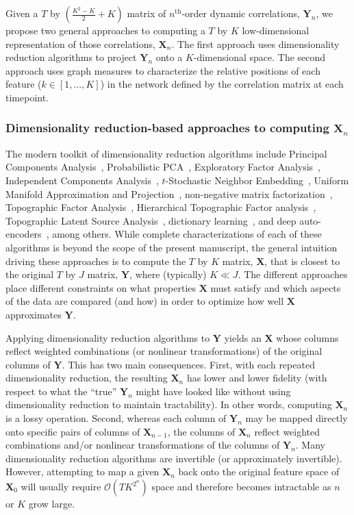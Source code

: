 \documentclass[english]{article}
\begin{document}
Given a $T$ by $\left( \frac{K^2 - K}{2} + K \right)$ matrix of
$n^\mathrm{th}$-order dynamic correlations, $\mathbf{Y}_n$, we propose
two general approaches to computing a $T$ by $K$ low-dimensional
representation of those correlations, $\mathbf{X}_n$.  The first
approach uses dimensionality reduction algorithms to project
$\mathbf{Y}_n$ onto a $K$-dimensional space.  The second approach uses
graph measures to characterize the relative positions of each feature
($k \in \left[1, ..., K \right]$) in the network defined by the
correlation matrix at each timepoint.

\subsubsection*{Dimensionality reduction-based approaches to computing
  $\mathbf{X}_n$}

The modern toolkit of dimensionality reduction algorithms include
Principal Components Analysis~\citep[PCA;][]{Pear01}, Probabilistic
PCA~\citep[PPCA;][]{TippBish99}, Exploratory Factor
Analysis~\citep[EFA;][]{Spea04}, Independent Components
Analysis~\citep[ICA;][]{JuttHera91, ComoEtal91}, $t$-Stochastic
Neighbor Embedding~\citep[$t$-SNE;][]{vandHint08}, Uniform Manifold
Approximation and Projection~\citep[UMAP;][]{McInEtal18}, non-negative
matrix factorization~\citep[NMF;][]{LeeSeun99}, Topographic Factor
Analysis~\cite[TFA;][]{MannEtal14b}, Hierarchical Topographic Factor
analysis~\cite[HTFA;][]{MannEtal18}, Topographic Latent Source
Analysis~\cite[TLSA;][]{GersEtal11}, dictionary
learning~\citep{MairEtal09a, MairEtal09b}, and deep
auto-encoders~\citep{HintSala06}, among others.  While complete
characterizations of each of these algorithms is beyond the scope of
the present manuscript, the general intuition driving these approaches
is to compute the $T$ by $K$ matrix, $\mathbf{X}$, that is closest to
the original $T$ by $J$ matrix, $\mathbf{Y}$, where (typically)
$K \ll J$.  The different approaches place different constraints on
what properties $\mathbf{X}$ must satisfy and which aspects of the
data are compared (and how) in order to optimize how well
$\mathbf{X}$ approximates $\mathbf{Y}$.

Applying dimensionality reduction algorithms to $\mathbf{Y}$ yields an
$\mathbf{X}$ whose columns reflect weighted combinations (or nonlinear
transformations) of the original columns of $\mathbf{Y}$.  This has
two main consequences.  First, with each repeated dimensionality
reduction, the resulting $\mathbf{X}_n$ has lower and lower fidelity
(with respect to what the ``true'' $\mathbf{Y}_n$ might have looked
like without using dimensionality reduction to maintain tractability).
In other words, computing $\mathbf{X}_n$ is a lossy operation.
Second, whereas each column of $\mathbf{Y}_n$ may be mapped
directly onto specific pairs of columns of $\mathbf{X}_{n-1}$, the
columns of $\mathbf{X}_n$ reflect weighted combinations and/or
nonlinear transformations of the columns of $\mathbf{Y}_n$.  Many
dimensionality reduction algorithms are invertible (or approximately
invertible).  However, attempting to map a given $\mathbf{X}_n$ back
onto the original feature space of $\mathbf{X}_0$ will usually require
$\mathcal{O}(TK^{2^n})$ space and therefore becomes intractable
as $n$ or $K$ grow large.
\end{document}
